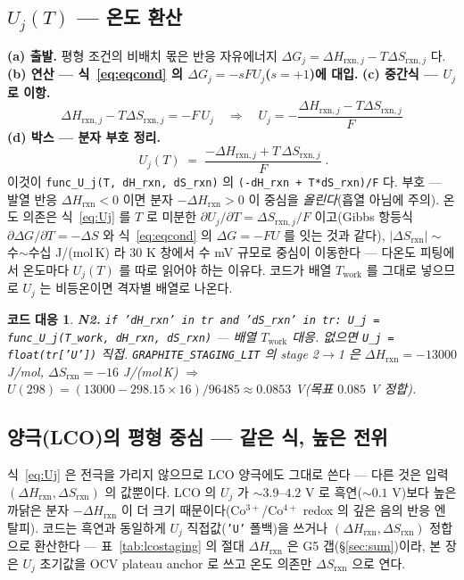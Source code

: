 \documentclass[11pt,a4paper]{article}
\newtheorem*{codebox}{코드 대응}
\newcommand{\rxn}{\mathrm{rxn}}
\newcommand{\work}{\mathrm{work}}
\newcommand{\code}[1]{\texttt{#1}}
\begin{document}
\subsection{$U_j(T)$ — 온도 환산}
\textbf{(a) 출발.} 평형 조건의 비배치 몫은 반응 자유에너지 $\Delta G_j=\Delta H_{\rxn,j}-T\Delta S_{\rxn,j}$ 다.
\textbf{(b) 연산 — 식~\eqref{eq:eqcond} 의 $\Delta G_j=-sFU_j$($s=+1$)에 대입.} \textbf{(c) 중간식 — $U_j$ 로 이항.}
\begin{equation}
\Delta H_{\rxn,j}-T\Delta S_{\rxn,j}=-F\,U_j
\quad\Longrightarrow\quad
U_j=-\frac{\Delta H_{\rxn,j}-T\Delta S_{\rxn,j}}{F}
\label{eq:Ujmid}
\end{equation}
\textbf{(d) 박스 — 분자 부호 정리.}
\begin{equation}
\boxed{\;U_j(T)\;=\;\frac{-\Delta H_{\rxn,j}+T\,\Delta S_{\rxn,j}}{F}\;.}
\label{eq:Uj}
\end{equation}
이것이 \code{func\_U\_j(T, dH\_rxn, dS\_rxn)} 의 \code{(-dH\_rxn + T*dS\_rxn)/F} 다. 부호 — 발열 반응
$\Delta H_\rxn<0$ 이면 분자 $-\Delta H_\rxn>0$ 이 중심을 \emph{올린다}(흡열 아님에 주의). 온도 의존은 식~\eqref{eq:Uj} 를
$T$ 로 미분한 $\partial U_j/\partial T=\Delta S_{\rxn,j}/F$ 이고(Gibbs 항등식 $\partial\Delta G/\partial T=-\Delta S$ 와
식~\eqref{eq:eqcond} 의 $\Delta G=-FU$ 를 잇는 것과 같다), $|\Delta S_\rxn|\sim$ 수$\sim$수십 J/(mol\,K) 라 $30$ K
창에서 수 mV 규모로 중심이 이동한다 — 다온도 피팅에서 온도마다 $U_j(T)$ 를 따로 읽어야 하는 이유다. 코드가 배열
$T_\work$ 를 그대로 넣으므로 $U_j$ 는 비등온이면 격자별 배열로 나온다.

\begin{codebox}
\textbf{N2.} \code{if 'dH\_rxn' in tr and 'dS\_rxn' in tr: U\_j = func\_U\_j(T\_work, dH\_rxn, dS\_rxn)}
— 배열 $T_\work$ 대응. 없으면 \code{U\_j = float(tr['U'])} 직접. \code{GRAPHITE\_STAGING\_LIT} 의 stage 2$\to$1 은
$\Delta H_\rxn=-13000$ J/mol, $\Delta S_\rxn=-16$ J/(mol\,K) $\Rightarrow$ $U(298)=(13000-298.15\times16)/96485
\approx0.0853$ V(목표 $0.085$ V 정합).
\end{codebox}

\subsection{양극(LCO)의 평형 중심 — 같은 식, 높은 전위}\label{sec:center-lco}
식~\eqref{eq:Uj} 은 전극을 가리지 않으므로 LCO 양극에도 그대로 쓴다 — 다른 것은 입력 $(\Delta H_\rxn,\Delta S_\rxn)$
의 값뿐이다. LCO 의 $U_j$ 가 $\sim3.9$--$4.2$ V 로 흑연($\sim0.1$ V)보다 높은 까닭은 분자 $-\Delta H_\rxn$ 이 더
크기 때문이다(Co$^{3+}$/Co$^{4+}$ redox 의 깊은 음의 반응 엔탈피). 코드는 흑연과 동일하게 $U_j$ 직접값(\code{'U'}
폴백)을 쓰거나 $(\Delta H_\rxn,\Delta S_\rxn)$ 정합으로 환산한다 — 표~\ref{tab:lcostaging} 의 절대 $\Delta H_\rxn$ 은
G5 갭(\S\ref{sec:sum})이라, 본 장은 $U_j$ 초기값을 OCV plateau anchor 로 쓰고 온도 의존만 $\Delta S_\rxn$ 으로 연다.
\end{document}

